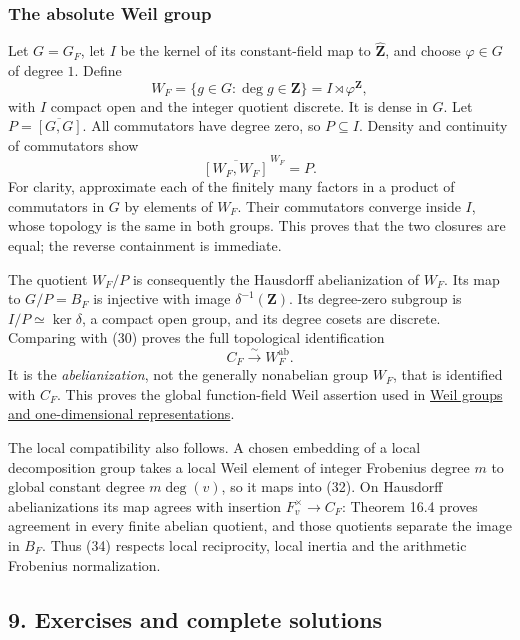 \documentclass[11pt,a4paper]{article}
\begin{document}
\subsubsection{The absolute Weil group}\label{the-absolute-weil-group}

Let \(G=G_F\), let \(I\) be the kernel of its constant-field map to
\(\widehat{\mathbf Z}\), and choose \(\varphi\in G\) of degree \(1\).
Define \[
W_F=\{g\in G:\deg g\in\mathbf Z\}=I\rtimes\varphi^{\mathbf Z},
\tag{32}
\] with \(I\) compact open and the integer quotient discrete. It is
dense in \(G\). Let \(P=\overline{[G,G]}\). All commutators have degree
zero, so \(P\subseteq I\). Density and continuity of commutators show \[
\overline{[W_F,W_F]}^{\,W_F}=P.
\tag{33}
\] For clarity, approximate each of the finitely many factors in a
product of commutators in \(G\) by elements of \(W_F\). Their
commutators converge inside \(I\), whose topology is the same in both
groups. This proves that the two closures are equal; the reverse
containment is immediate.

The quotient \(W_F/P\) is consequently the Hausdorff abelianization of
\(W_F\). Its map to \(G/P=B_F\) is injective with image
\(\delta^{-1}(\mathbf Z)\). Its degree-zero subgroup is
\(I/P\simeq\ker\delta\), a compact open group, and its degree cosets are
discrete. Comparing with (30) proves the full topological identification
\[
C_F\xrightarrow{\sim}W_F^{\mathrm{ab}}.
\tag{34}
\] It is the \emph{abelianization}, not the generally nonabelian group
\(W_F\), that is identified with \(C_F\). This proves the global
function-field Weil assertion used in
\href{../weil-groups-and-one-dimensional-representations.html}{Weil
groups and one-dimensional representations}.

The local compatibility also follows. A chosen embedding of a local
decomposition group takes a local Weil element of integer Frobenius
degree \(m\) to global constant degree \(m\deg(v)\), so it maps into
(32). On Hausdorff abelianizations its map agrees with insertion
\(F_v^\times\to C_F\): Theorem 16.4 proves agreement in every finite
abelian quotient, and those quotients separate the image in \(B_F\).
Thus (34) respects local reciprocity, local inertia and the arithmetic
Frobenius normalization.

\subsection{9. Exercises and complete
solutions}\label{exercises-and-complete-solutions}
\end{document}
